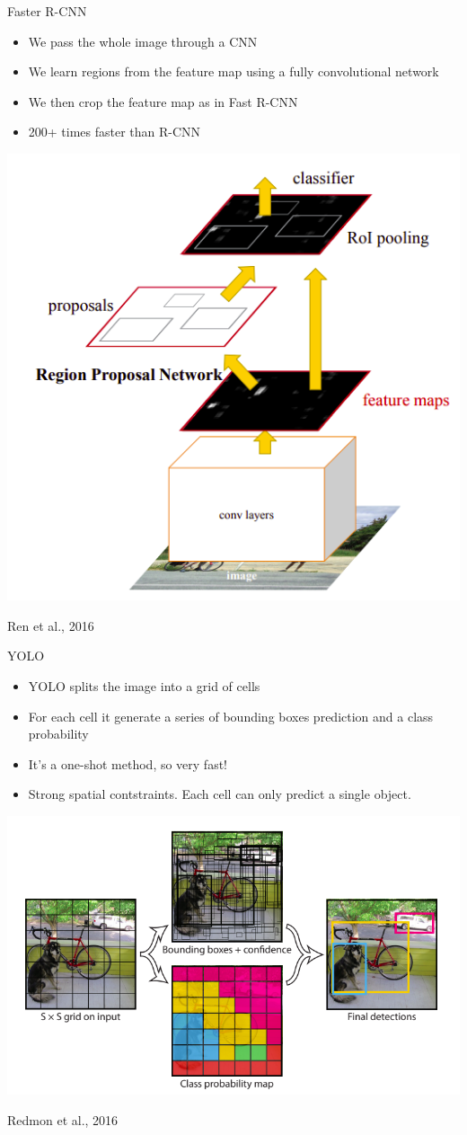\documentclass[9pt, aspectratio=169]{beamer}
\begin{document}
\begin{frame}
    {Faster R-CNN}
    \begin{itemize}
        \item We pass the whole image through a CNN
        \item We learn regions from the feature map using a fully convolutional network
        \item We then crop the feature map as in Fast R-CNN
        \item 200+ times faster than R-CNN
    \end{itemize}
    \centering
    \includegraphics[width=.4\textwidth]{Ren_2016_faster_rcnn.png}

    \footnotesize
    Ren et al., 2016
\end{frame}

\begin{frame}
    {YOLO}
    \begin{itemize}
    \item YOLO splits the image into a grid of cells
    \item For each cell it generate a series of bounding boxes prediction and a class probability
    \item It's a one-shot method, so very fast!
    \item Strong spatial contstraints. Each cell can only predict a single object. 
    \end{itemize}
    \centering
    \includegraphics[width=.6\textwidth]{Redmon2016_YOLO.png}

    \footnotesize
    Redmon et al., 2016
\end{frame}
\end{document}
